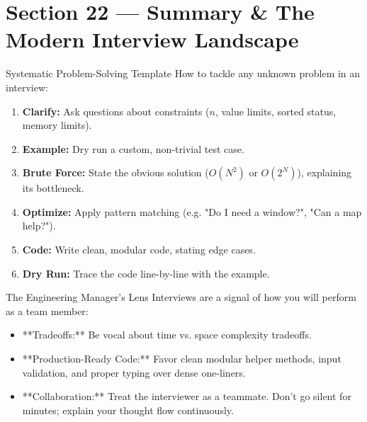 \section{Section 22 — Summary \& The Modern Interview Landscape}

\begin{frame}[c]{\empty}
    \begin{center}
        \Large\textbf{\secname}
    \end{center}
\end{frame}

\begin{frame}{Systematic Problem-Solving Template}
  How to tackle any unknown problem in an interview:
  \begin{enumerate}
    \item \textbf{Clarify:} Ask questions about constraints ($n$, value limits, sorted status, memory limits).
    \item \textbf{Example:} Dry run a custom, non-trivial test case.
    \item \textbf{Brute Force:} State the obvious solution ($O(N^2)$ or $O(2^N)$), explaining its bottleneck.
    \item \textbf{Optimize:} Apply pattern matching (e.g. "Do I need a window?", "Can a map help?").
    \item \textbf{Code:} Write clean, modular code, stating edge cases.
    \item \textbf{Dry Run:} Trace the code line-by-line with the example.
  \end{enumerate}
\end{frame}

\begin{frame}{The Engineering Manager's Lens}
  Interviews are a signal of how you will perform as a team member:
  \begin{itemize}
    \item **Tradeoffs:** Be vocal about time vs. space complexity tradeoffs.
    \item **Production-Ready Code:** Favor clean modular helper methods, input validation, and proper typing over dense one-liners.
    \item **Collaboration:** Treat the interviewer as a teammate. Don't go silent for minutes; explain your thought flow continuously.
  \end{itemize}
\end{frame}

